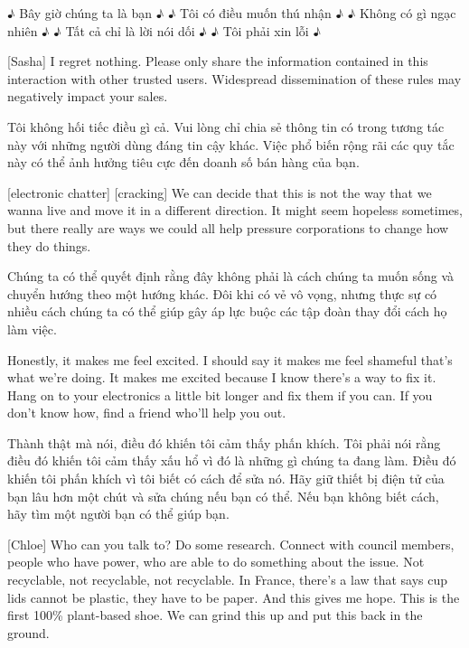 \documentclass[a4paper]{article}
\begin{document}
	\begin{vietnamese-v2}
		 ♪ Bây giờ chúng ta là bạn ♪
		♪ Tôi có điều muốn thú nhận ♪
		♪ Không có gì ngạc nhiên ♪
		♪ Tất cả chỉ là lời nói dối ♪
		♪ Tôi phải xin lỗi ♪
	\end{vietnamese-v2}
	
	[Sasha] I regret nothing.
	Please only share the information contained in this interaction with other trusted users.
	Widespread dissemination of these rules may negatively impact your sales.
	
	\begin{vietnamese-v2}
		[Sasha] Tôi không hối tiếc điều gì cả.
		Vui lòng chỉ chia sẻ thông tin có trong tương tác này với những người dùng đáng tin cậy khác.
		Việc phổ biến rộng rãi các quy tắc này có thể ảnh hưởng tiêu cực đến doanh số bán hàng của bạn.
	\end{vietnamese-v2}
	
	[electronic chatter]
	[cracking]
	We can decide that this is not the way that we wanna live and move it in a different direction.
	It might seem hopeless sometimes, but there really are ways we could all help pressure corporations to change how they do things.
	
	\begin{vietnamese-v2}
		Chúng ta có thể quyết định rằng đây không phải là cách chúng ta muốn sống và chuyển hướng theo một hướng khác.
		Đôi khi có vẻ vô vọng, nhưng thực sự có nhiều cách chúng ta có thể giúp gây áp lực buộc các tập đoàn thay đổi cách họ làm việc.
	\end{vietnamese-v2}
	
	Honestly, it makes me feel excited.
	I should say it makes me feel shameful that's what we're doing.
	It makes me excited because I know there's a way to fix it.
	Hang on to your electronics a little bit longer and fix them if you can.
	If you don't know how, find a friend who'll help you out.
	
	\begin{vietnamese-v2}
		Thành thật mà nói, điều đó khiến tôi cảm thấy phấn khích.
		Tôi phải nói rằng điều đó khiến tôi cảm thấy xấu hổ vì đó là những gì chúng ta đang làm.
		Điều đó khiến tôi phấn khích vì tôi biết có cách để sửa nó.
		Hãy giữ thiết bị điện tử của bạn lâu hơn một chút và sửa chúng nếu bạn có thể.
		Nếu bạn không biết cách, hãy tìm một người bạn có thể giúp bạn.
	\end{vietnamese-v2}
	
	[Chloe] Who can you talk to? Do some research.
	Connect with council members, people who have power, who are able to do something about the issue.
	Not recyclable, not recyclable, not recyclable.
	In France, there's a law that says cup lids cannot be plastic, they have to be paper.
	And this gives me hope.
	This is the first 100\% plant-based shoe.
	We can grind this up and put this back in the ground.
	
\end{document}
